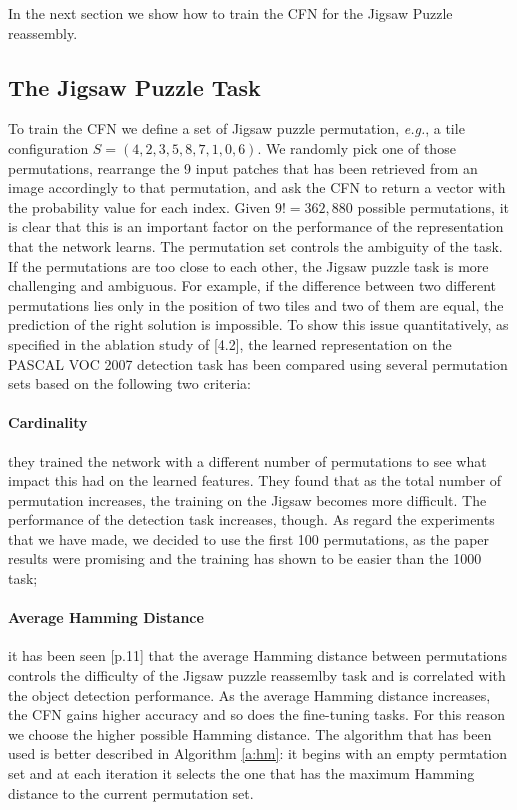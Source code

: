 In the next section we show how to train the CFN for the Jigsaw Puzzle reassembly.



\subsection{The Jigsaw Puzzle Task}
To train the CFN we define a set of Jigsaw puzzle permutation, \textit{e.g.}, a tile configuration \(S=(4, 2, 3, 5, 8, 7, 1, 0, 6)\). We randomly pick one of those permutations, rearrange the 9 input patches that has been retrieved from an image accordingly to that permutation, and ask the CFN to return a vector with the probability value for each index. Given \(9!=362,880\) possible permutations, it is clear that this is an important factor on the performance of the representation that the network learns. \newline
The permutation set controls the ambiguity of the task. If the permutations are too close to each other, the Jigsaw puzzle task is more challenging and ambiguous. For example, if the difference between two different permutations lies only in the position of two tiles and two of them are equal, the prediction of the right solution is impossible. To show this issue quantitatively, as specified in the ablation study of \cite{Noroozi_2016}[4.2], the learned representation on the PASCAL VOC 2007 detection task has been compared using several permutation sets based on the following two criteria:
\paragraph{Cardinality}
they trained the network with a different number of permutations to see what impact this had on the learned features. They found that as the total number of permutation increases, the training on the Jigsaw becomes more difficult. The performance of the detection task increases, though. As regard the experiments that we have made, we decided to use the first 100 permutations, as the paper results were promising and the training has shown to be easier than the 1000 task;
\paragraph{Average Hamming Distance}
it has been seen \cite{Noroozi_2016}[p.11] that the average Hamming distance between permutations controls the difficulty of the Jigsaw puzzle reassemlby task and is correlated with the object detection performance. As the average Hamming distance increases, the CFN gains higher accuracy and so does the fine-tuning tasks. For this reason we choose the higher possible Hamming distance. The algorithm that has been used is better described in Algorithm \ref{a:hm}: it begins with an empty permtation set and at each iteration it selects the one that has the maximum Hamming distance to the current permutation set.

